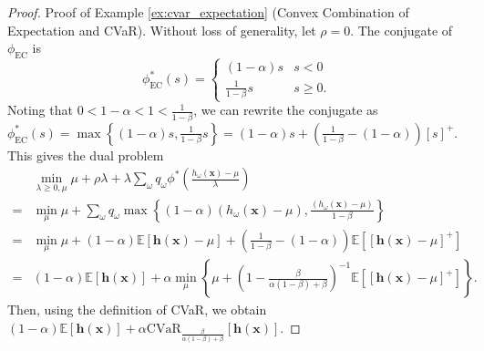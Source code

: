 \documentclass[opre,nonblindrev]{informs3} %
\newcommand{\E}{\mathbb{E}}
\newcommand{\e}[1]{\E \left[ #1 \right]}
\newcommand{\x}{\mathbf{x}}
\renewcommand{\h}{\mathbf{h}}
\begin{document}
\begin{APPENDICES}
\begin{proof}{\sc Proof of Example \ref{ex:cvar_expectation} (Convex Combination of Expectation and CVaR).}
	Without loss of generality, let $\rho = 0$.
	The conjugate of $\phi_{\text{EC}}$ is
	\[
		\phi_{\text{EC}}^*(s) =
		\begin{cases}
			(1-\alpha) s & s < 0 \\
			\frac{1}{1-\beta} s & s \geq 0.
		\end{cases}
	\]
	Noting that $0<1-\alpha < 1 < \frac{1}{1-\beta}$, we can rewrite the conjugate as $\phi_{\text{EC}}^*(s) = \max \left\{ (1-\alpha) s, \frac{1}{1-\beta} s \right\} = (1-\alpha) s + \left( \frac{1}{1-\beta} - (1-\alpha) \right) [s]^+$. 
	This gives the dual problem
	\begin{align*}
		& \min_{\lambda \geq 0,\mu}  \mu + \rho \lambda + \lambda \sum_\omega q_\omega \phi^*\left(\frac{h_\omega(\x)-\mu}{\lambda}\right) \\
		= & \min_\mu \mu + \sum_\omega q_\omega \max \left\{ (1-\alpha)(h_\omega(\x)-\mu), \frac{(h_\omega(\x)-\mu)}{1-\beta} \right\} \\
		= & \min_\mu \mu + (1-\alpha)\e{\h(\x)-\mu} + \left( \frac{1}{1-\beta} - (1-\alpha) \right) \e{[\h(\x)-\mu]^+} \\ 
		= & (1-\alpha)\e{\h(\x)} + \alpha \min_\mu \left\{ \mu + \left(1 - \frac{\beta}{\alpha(1-\beta)+\beta}\right)^{-1} \e{[\h(\x)-\mu]^+} \right\}. 
	\end{align*}
	Then, using the definition of CVaR, we obtain
	$%
		(1-\alpha)\e{\h(\x)} + \alpha \mbox{CVaR}_{\frac{\beta}{\alpha(1-\beta)+\beta}}[\h(\x)]. 
	$%
	\Halmos 
%
%
\end{proof}

 
 \end{APPENDICES}
\end{document}

